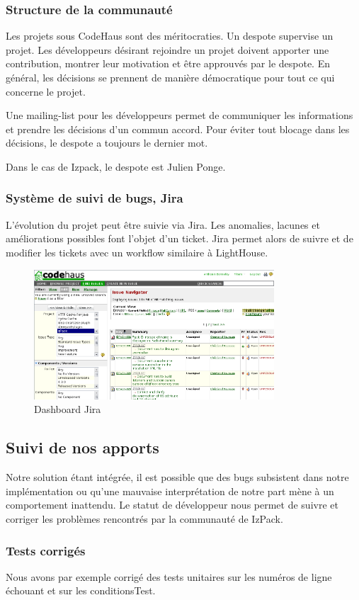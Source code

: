 \subsubsection{Structure de la communauté}
Les projets sous CodeHaus sont des méritocraties. 
Un despote supervise un projet.
Les développeurs désirant rejoindre un projet doivent apporter une contribution, montrer leur motivation et être approuvés par le despote.
En général, les décisions se prennent de manière démocratique pour tout ce qui concerne le projet.

Une mailing-list pour les développeurs permet de communiquer les informations et prendre les décisions d'un commun accord.
Pour éviter tout blocage dans les décisions, le despote a toujours le dernier mot.

Dans le cas de Izpack, le despote est Julien Ponge.
\subsubsection{Système de suivi de bugs, Jira}
L'évolution du projet peut être suivie via Jira.
Les anomalies, lacunes et améliorations possibles font l'objet d'un ticket.
Jira permet alors de suivre et de modifier les tickets avec un workflow similaire à LightHouse.
\begin{figure}[H]
	\centering
	\includegraphics[width=0.8\textwidth]{../image/jira.png}
	\caption{Dashboard Jira}
\end{figure}
\subsection{Suivi de nos apports}
Notre solution étant intégrée, il est possible que des bugs subsistent dans notre implémentation ou qu'une mauvaise interprétation de notre part mène à un comportement inattendu.
Le statut de développeur nous permet de suivre et corriger les problèmes rencontrés par la communauté de IzPack.
\subsubsection{Tests corrigés}
Nous avons par exemple corrigé des tests unitaires sur les numéros de ligne échouant et sur les conditionsTest.
